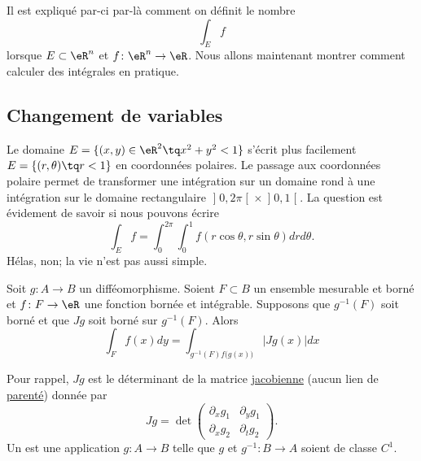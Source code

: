 
Il est expliqué par-ci par-là comment on définit le nombre
\begin{equation}
	\int_Ef
\end{equation}
lorsque $E\subset\eR^n$ et $f\colon \eR^n\to \eR$. Nous allons maintenant montrer comment calculer des intégrales en pratique.

					\subsection{Changement de variables}

Le domaine $E=\{ (x,y)\in\eR^2\tq x^2+y^2<1 \}$ s'écrit plus facilement $E=\{ (r,\theta)\tq r<1 \}$ en coordonnées polaires. Le passage aux coordonnées polaire permet de transformer une intégration sur un domaine rond à une intégration sur le domaine rectangulaire $\mathopen]0,2\pi\mathclose[\times\mathopen]0,1\mathclose[$. La question est évidement de savoir si nous pouvons écrire
\begin{equation}
	\int_Ef=\int_{0}^{2\pi}\int_0^1f(r\cos\theta,r\sin\theta)drd\theta.
\end{equation}
Hélas, non; la vie n'est pas aussi simple.

\begin{theorem}
Soit $g\colon A\to B$ un difféomorphisme. Soient $F\subset B$ un ensemble mesurable et borné et $f\colon F\to \eR$ une fonction bornée et intégrable. Supposons que $g^{-1}(F)$ soit borné et que $Jg$ soit borné sur $g^{-1}(F)$. Alors
\begin{equation}
	\int_Ff(x)dy=\int_{g^{-1}(F)f\big( g(x) \big)}| Jg(x) |dx
\end{equation}
\end{theorem}
Pour rappel, $Jg$ est le déterminant de la matrice \href{http://fr.wikipedia.org/wiki/Matrice_jacobienne}{jacobienne} (aucun lien de \href{http://fr.wikipedia.org/wiki/Jacob}{parenté}) donnée par
\begin{equation}
	Jg=\det\begin{pmatrix}
	\partial_xg_1	&	\partial_yg_1	\\ 
	\partial_xg_2	&	\partial_tg_2	
\end{pmatrix}.
\end{equation}
Un  est une application $g\colon A\to B$ telle que $g$ et $g^{-1}\colon B\to A$ soient de classe $C^1$.

